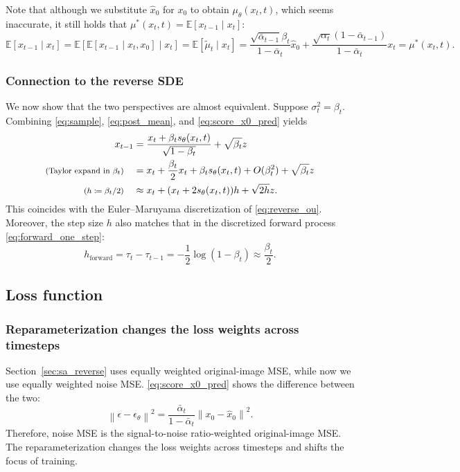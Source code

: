 \documentclass[11pt,a4paper]{article}
\theoremstyle{plain} %
\theoremstyle{definition}
\theoremstyle{remark}
\newcommand{\norm}[1]{\mathopen{}\left\lVert#1\right\rVert}
\newcommand{\E}{\mathbb{E}}
\newcommand{\sco}{s_\theta(x_t,t)}
\newcommand{\pmean}{\mu_\theta(x_t,t)}
\begin{document}
Note that although we substitute $\hat x_0$ for $x_0$ to obtain $\pmean$, which seems inaccurate, it still holds that $\mu^*(x_t,t)=\E[x_{t-1}\mid x_t]$:
\[\E[x_{t-1}\mid x_t] = \E[\E[x_{t-1}\mid x_t,x_0]\mid x_t] = \E[\tilde\mu_t\mid x_t] = \frac{\sqrt{\bar\alpha_{t-1}}\beta_t}{1-\bar\alpha_t}\hat x_0+\frac{\sqrt{\alpha_t}(1-\bar\alpha_{t-1})}{1-\bar\alpha_t}x_t=\mu^*(x_t,t).\]

\subsubsection{Connection to the reverse SDE}

We now show that the two perspectives are almost equivalent. Suppose $\sigma_t^2=\beta_t$. Combining \eqref{eq:sample}, \eqref{eq:post_mean}, and \eqref{eq:score_x0_pred} yields
\begin{align*}
    x_{t-1} &= \frac{x_t+\beta_t\sco}{\sqrt{1-\beta_t}} + \sqrt{\beta_t}z \\
    \text{\footnotesize(Taylor expand in $\beta_t$)}\quad &= x_t + \frac{\beta_t}{2}x_t + \beta_t\sco + O(\beta_t^2) + \sqrt{\beta_t}z \\
    \text{\footnotesize($h\coloneq\beta_t/2$)}\quad &\approx x_t + (x_t + 2\sco)h + \sqrt{2h}z.
\end{align*}
This coincides with the Euler--Maruyama discretization of \eqref{eq:reverse_ou}. Moreover, the step size $h$ also matches that in the discretized forward process \eqref{eq:forward_one_step}:
\[h_{\mathrm{forward}} = \tau_t - \tau_{t-1} = -\frac12\log(1-\beta_t)\approx\frac{\beta_t}{2}.\]

\subsection{Loss function}

\subsubsection{Reparameterization changes the loss weights across timesteps}

Section~\ref{sec:sa_reverse} uses equally weighted original-image MSE, while now we use equally weighted noise MSE. \eqref{eq:score_x0_pred} shows the difference between the two:
\[\norm{\epsilon-\epsilon_\theta}^2 = \frac{\bar\alpha_t}{1-\bar\alpha_t}\norm{x_0-\hat x_0}^2.\]
Therefore, noise MSE is the signal-to-noise ratio-weighted original-image MSE. The reparameterization changes the loss weights across timesteps and shifts the focus of training.
\end{document}
